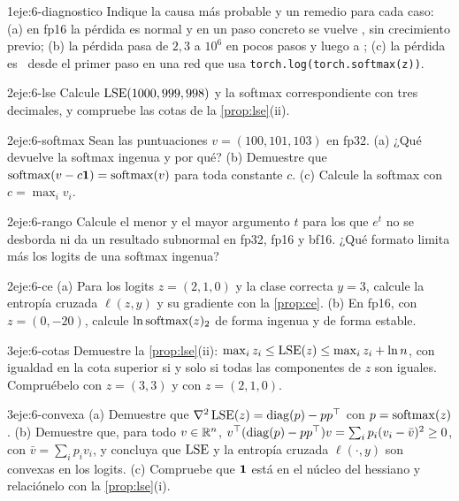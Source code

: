 \begin{ejercicio}{1}{eje:6-diagnostico}
Indique la causa más probable y un remedio para cada caso: (a) en fp16 la pérdida es normal y en un paso concreto se vuelve \Inf, sin crecimiento previo; (b) la pérdida pasa de $2{,}3$ a $10^{6}$ en pocos pasos y luego a \NaN; (c) la pérdida es \NaN\ desde el primer paso en una red que usa \texttt{torch.log(torch.softmax(z))}.
\end{ejercicio}

\begin{ejercicio}{2}{eje:6-lse}
Calcule $\operatorname{LSE}(1000,999,998)$ y la softmax correspondiente con tres decimales, y compruebe las cotas de la \cref{prop:lse}(ii).
\end{ejercicio}

\begin{ejercicio}{2}{eje:6-softmax}
Sean las puntuaciones $v=(100,101,103)$ en fp32. (a) ¿Qué devuelve la softmax ingenua y por qué? (b) Demuestre que $\operatorname{softmax}(v-c\mathbf{1})=\operatorname{softmax}(v)$ para toda constante $c$. (c) Calcule la softmax con $c=\max_iv_i$.
\end{ejercicio}

\begin{ejercicio}{2}{eje:6-rango}
Calcule el menor y el mayor argumento $t$ para los que $e^{t}$ no se desborda ni da un resultado subnormal en fp32, fp16 y bf16. ¿Qué formato limita más los logits de una softmax ingenua?
\end{ejercicio}

\begin{ejercicio}{2}{eje:6-ce}
(a) Para los logits $z=(2,1,0)$ y la clase correcta $y=3$, calcule la entropía cruzada $\ell(z,y)$ y su gradiente con la \cref{prop:ce}. (b) En fp16, con $z=(0,-20)$, calcule $\ln\operatorname{softmax}(z)_2$ de forma ingenua y de forma estable.
\end{ejercicio}

\begin{ejercicio}{3}{eje:6-cotas}
Demuestre la \cref{prop:lse}(ii): $\max_iz_i\le\operatorname{LSE}(z)\le\max_iz_i+\ln n$, con igualdad en la cota superior si y solo si todas las componentes de $z$ son iguales. Compruébelo con $z=(3,3)$ y con $z=(2,1,0)$.
\end{ejercicio}

\begin{ejercicio}{3}{eje:6-convexa}
(a) Demuestre que $\nabla^{2}\operatorname{LSE}(z)=\operatorname{diag}(p)-pp^{\top}$ con $p=\operatorname{softmax}(z)$. (b) Demuestre que, para todo $v\in\mathbb{R}^{n}$, $v^{\top}(\operatorname{diag}(p)-pp^{\top})v=\sum_ip_i(v_i-\bar v)^{2}\ge 0$, con $\bar v=\sum_ip_iv_i$, y concluya que $\operatorname{LSE}$ y la entropía cruzada $\ell(\cdot,y)$ son convexas en los logits. (c) Compruebe que $\mathbf{1}$ está en el núcleo del hessiano y relaciónelo con la \cref{prop:lse}(i).
\end{ejercicio}
